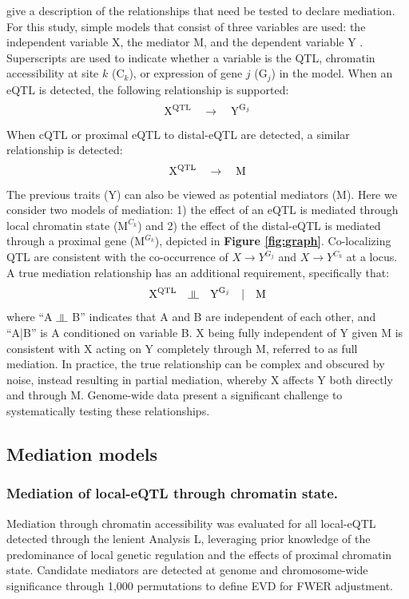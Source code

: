 \documentclass[9pt,twocolumn,twoside]{gsajnl}
\newcommand{\indep}{\rotatebox[origin=c]{90}{$\models$}}
\begin{document}
\cite{Baron1986} give a description of the relationships that need be tested to declare mediation. For this study, simple models that consist of three variables are used: the independent variable X, the mediator M, and the dependent variable Y \citep{MacKinnon2007}. Superscripts are used to indicate whether a variable is the QTL, chromatin accessibility at site $k$ ($\text{C}_{k}$), or expression of gene $j$ ($\text{G}_{j}$) in the model. When an eQTL is detected, the following relationship is supported:
\begin{equation}
\text{X}\textsuperscript{QTL} \quad \rightarrow \quad \text{Y}^{\text{G}_{j}}
\label{rel:eQTL}
\end{equation}
When cQTL or proximal eQTL to distal-eQTL are detected, a similar relationship is detected:
\begin{equation}
\text{X}\textsuperscript{QTL} \quad \rightarrow \quad \text{M}
\label{rel:cQTL}
\end{equation}
The previous traits (Y) can also be viewed as potential mediators (M). Here we consider two models of mediation: 1) the effect of an eQTL is mediated through local chromatin state ($\text{M}^{C_{k}}$) and 2) the effect of the distal-eQTL is mediated through a proximal gene ($\text{M}^{G_{k}}$), depicted in \textbf{Figure \ref{fig:graph}}. Co-localizing QTL are consistent with the co-occurrence of $X \rightarrow Y^{G_{j}}$ and $X \rightarrow Y^{C_{k}}$ at a locus. A true mediation relationship has an additional requirement, specifically that: 
\begin{equation}
\text{X}\textsuperscript{QTL} \quad \indep \quad \text{Y}^{\text{G}_{j}} \quad | \quad \text{M}
\label{rel:full_mediator}
\end{equation}
where ``A $\indep$ B'' indicates that A and B are independent of each other, and ``A|B'' is A conditioned on variable B. X being fully independent of Y given M is consistent with X acting on Y completely through M, referred to as full mediation. In practice, the true relationship can be complex and obscured by noise, instead resulting in partial mediation, whereby X affects Y both directly and through M. Genome-wide data present a significant challenge to systematically testing these relationships.

\subsection{Mediation models}

\subsubsection{Mediation of local-eQTL through chromatin state.}
Mediation through chromatin accessibility was evaluated for all local-eQTL detected through the lenient Analysis L, leveraging prior knowledge of the predominance of local genetic regulation and the effects of proximal chromatin state. Candidate mediators are detected at genome and chromosome-wide significance through 1,000 permutations to define EVD for FWER adjustment.
\end{document}

